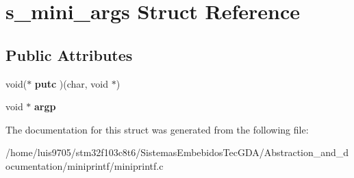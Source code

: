\hypertarget{structs__mini__args}{}\section{s\+\_\+mini\+\_\+args Struct Reference}
\label{structs__mini__args}
\subsection*{Public Attributes}
\begin{DoxyCompactItemize}
\item 
\mbox{\label{structs__mini__args_a150c5c7a07d3aa0301fae09b17d3e43f}} 
void($\ast$ {\bfseries putc} )(char, void $\ast$)
\item 
\mbox{\label{structs__mini__args_ae4547bc8c8a470df0e6d60b02d15ed37}} 
void $\ast$ {\bfseries argp}
\end{DoxyCompactItemize}


The documentation for this struct was generated from the following file\+:\begin{DoxyCompactItemize}
\item 
/home/luis9705/stm32f103c8t6/\+Sistemas\+Embebidos\+Tec\+G\+D\+A/\+Abstraction\+\_\+and\+\_\+documentation/miniprintf/miniprintf.\+c\end{DoxyCompactItemize}
